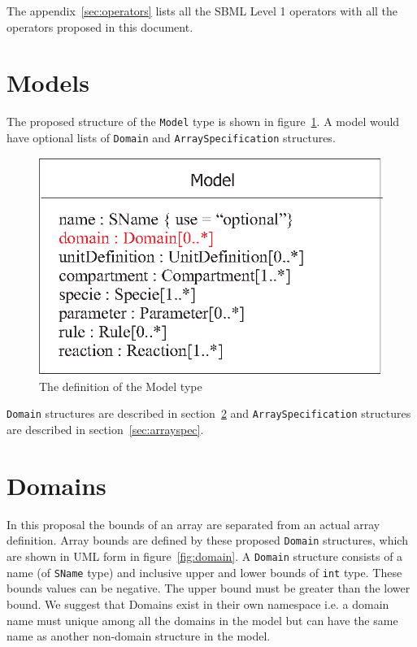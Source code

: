 \documentclass{cekarticle}
\begin{document}
The appendix~\ref{sec:operators} lists all the SBML Level 1 operators
with all the operators proposed in this document.

\section{Models}

The proposed structure of the \texttt{Model} type is shown in
figure~\ref{fig:model}. A model would have optional lists of
\texttt{Domain} and \texttt{ArraySpecification} structures.

\begin{figure}[h]
  \vspace*{8pt}
  \centering
  \includegraphics[scale = 0.7]{model}
  \caption{The definition of the Model type}
  \label{fig:model}
\end{figure}

\texttt{Domain} structures are described in
section~\ref{sec:domain} and \texttt{ArraySpecification}
structures are described in section~\ref{sec:arrayspec}.

\section{Domains}
\label{sec:domain}

In this proposal the bounds of an array are separated from an
actual array definition.  Array bounds are defined by these
proposed \texttt{Domain} structures, which are shown in UML form
in figure~\ref{fig:domain}.  A \texttt{Domain} structure consists
of a name (of \texttt{SName} type) and inclusive upper and lower
bounds of \texttt{int} type.  These bounds values can be
negative.  The upper bound must be greater than the lower bound.
We suggest that Domains exist in their own namespace i.e. a
domain name must unique among all the domains in the model but
can have the same name as another non-domain structure in the
model.
\end{document}
